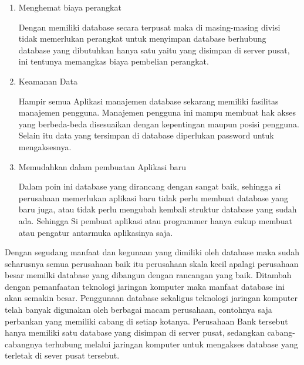	\begin{enumerate}
		\item Menghemat biaya perangkat \par
Dengan memiliki database secara terpusat maka di masing-masing divisi tidak memerlukan perangkat untuk menyimpan database berhubung database yang dibutuhkan hanya satu yaitu yang disimpan di server pusat, ini tentunya memangkas biaya pembelian perangkat. \par
 
		\item Keamanan Data \par
Hampir semua Aplikasi manajemen database sekarang memiliki fasilitas manajemen pengguna. Manajemen pengguna ini mampu membuat hak akses yang berbeda-beda disesuaikan dengan kepentingan maupun posisi pengguna. Selain itu data yang tersimpan di database diperlukan password untuk mengaksesnya. \par

		\item Memudahkan dalam pembuatan Aplikasi baru \par
Dalam poin ini database yang dirancang dengan sangat baik, sehingga si perusahaan memerlukan aplikasi baru tidak perlu membuat database yang baru juga, atau tidak perlu mengubah kembali struktur database yang sudah ada. Sehingga Si pembuat aplikasi atau programmer hanya cukup membuat atau pengatur antarmuka aplikasinya saja. \par
	\end{enumerate}

\par
Dengan segudang manfaat dan kegunaan yang dimiliki oleh database maka sudah seharusnya semua perusahaan baik itu perusahaan skala kecil apalagi perusahaan besar memilki database yang dibangun dengan rancangan yang baik. Ditambah dengan pemanfaatan teknologi jaringan komputer maka manfaat database ini akan semakin besar. Penggunaan database sekaligus teknologi jaringan komputer telah banyak digunakan oleh berbagai macam perusahaan, contohnya saja perbankan yang memiliki cabang di setiap kotanya. Perusahaan Bank tersebut hanya memiliki satu database yang disimpan di server pusat, sedangkan cabang-cabangnya terhubung melalui jaringan komputer untuk mengakses database yang terletak di sever pusat tersebut. \par
\vspace{12pt}

